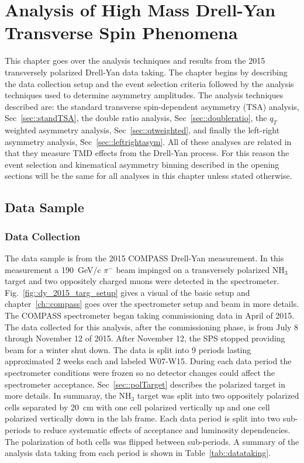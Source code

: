 \chapter{Analysis of High Mass Drell-Yan Transverse Spin Phenomena}
\label{ch::hmanalysis}
\ifpdf
\graphicspath{{Chapters/HMAnalysis/Figs/}}
\fi

This chapter goes over the analysis techniques and results from the 2015
transversely polarized Drell-Yan data taking.  The chapter begins by describing
the data collection setup and the event selection criteria followed by the
analysis techniques used to determine asymmetry amplitudes.  The analysis
techniques described are: the standard transverse spin-dependent asymmetry (TSA)
analysis, Sec~\ref{sec::standTSA}, the double ratio analysis,
Sec~\ref{sec::doubleratio}, the $q_T$ weighted asymmetry analysis,
Sec~\ref{sec::qtweighted}, and finally the left-right asymmetry analysis,
Sec~\ref{sec::leftrightasym}.  All of these analyses are related in that they
measure TMD effects from the Drell-Yan process.  For this reason the event
selection and kinematical asymmetry binning described in the opening sections
will be the same for all analyses in this chapter unless stated otherwise.

\section{Data Sample} \label{sec::datasample}

\subsection{Data Collection} \label{sec::datacollection}

The data sample is from the 2015 COMPASS Drell-Yan measurement.  In this
measurement a 190~GeV/c $\pi^-$ beam impinged on a transversely polarized NH$_3$
target and two oppositely charged muons were detected in the spectrometer.
Fig.~\ref{fig::dy_2015_targ_setup} gives a visual of the basic setup and
chapter~\ref{ch::compass} goes over the spectrometer setup and beam in more
details.  The COMPASS spectrometer began taking commissioning data in April of
2015.  The data collected for this analysis, after the commissioning phase, is
from July 8 through November 12 of 2015.  After November 12, the SPS stopped
providing beam for a winter shut down.  The data is split into 9 periods lasting
approximated 2 weeks each and labeled W07-W15.  During each data period the
spectrometer conditions were frozen so no detector changes could affect the
spectrometer acceptance.  Sec~\ref{sec::polTarget} describes the polarized
target in more details.  In summaray, the NH$_3$ target was split into two
oppositely polarized cells separated by 20~cm with one cell polarized vertically
up and one cell polarized vertically down in the lab frame.  Each data period is
split into two sub-periods to reduce systematic effects of acceptance and
luminosity dependencies.  The polarization of both cells was flipped between
sub-periods.  A summary of the analysis data taking from each period is shown in
Table~\ref{tab::datataking}.

